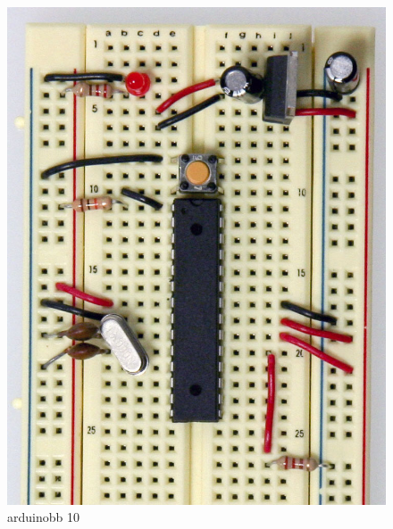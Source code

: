 \begin{figure}[!htb]
 \centering
 \includegraphics[scale=0.3]{img/arduino_breadboard/arduinobb_10.jpg}
 \caption{arduinobb 10}
 \label{arduinobb 10}
\end{figure}


